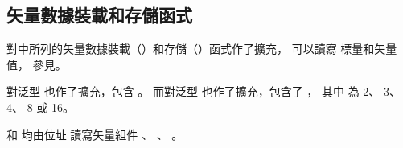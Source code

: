 \subsection[section:vectorLsFuncHalf]{矢量數據裝載和存儲函式}

對中所列的矢量數據裝載（）和存儲（）函式作了擴充，
可以讀寫  標量和矢量值，
參見。

對泛型  也作了擴充，包含 。
而對泛型  也作了擴充，包含了 ，
其中  為 2、 3、 4、 8 或 16。

\startnotepar
{} 和 
均由位址  讀寫矢量組件 、 、 。
\stopnotepar

{}
